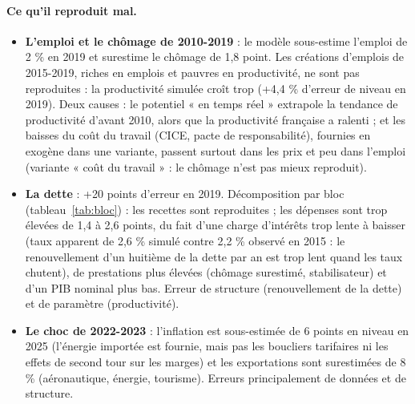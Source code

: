\paragraph{Ce qu'il reproduit mal.}
\begin{itemize}
\item \textbf{L'emploi et le chômage de 2010-2019} : le modèle sous-estime l'emploi de 2 \% en 2019 et surestime le
chômage de 1,8 point. Les créations d'emplois de 2015-2019, riches en emplois et pauvres en productivité, ne sont
pas reproduites : la productivité simulée croît trop (+4,4 \% d'erreur de niveau en 2019). Deux causes : le potentiel
« en temps réel » extrapole la tendance de productivité d'avant 2010, alors que la productivité française a ralenti ;
et les baisses du coût du travail (CICE, pacte de responsabilité), fournies en exogène dans une variante, passent
surtout dans les prix et peu dans l'emploi (variante « coût du travail » : le chômage n'est pas mieux reproduit).
\item \textbf{La dette} : +20 points d'erreur en 2019. Décomposition par bloc (tableau~\ref{tab:bloc}) : les recettes
sont reproduites ; les dépenses sont trop élevées de 1,4 à 2,6 points, du fait d'une charge d'intérêts trop lente à
baisser (taux apparent de 2,6 \% simulé contre 2,2 \% observé en 2015 : le renouvellement d'un huitième de la dette
par an est trop lent quand les taux chutent), de prestations plus élevées (chômage surestimé, stabilisateur) et d'un
PIB nominal plus bas. Erreur de structure (renouvellement de la dette) et de paramètre (productivité).
\item \textbf{Le choc de 2022-2023} : l'inflation est sous-estimée de 6 points en niveau en 2025 (l'énergie importée est
fournie, mais pas les boucliers tarifaires ni les effets de second tour sur les marges) et les exportations sont
surestimées de 8 \% (aéronautique, énergie, tourisme). Erreurs principalement de données et de structure.
\end{itemize}

\begin{table}[htbp]\centering\small
\caption{Test par bloc des finances publiques (origine 2010, modèle v0.8) : simulé / observé, en \% du PIB.}\label{tab:bloc}
\end{table}


